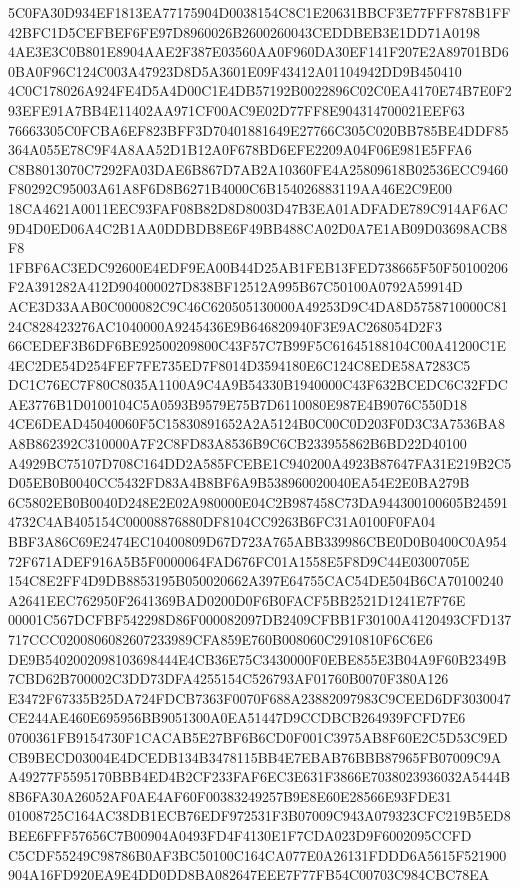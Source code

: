 \documentclass[UTF8,fontset=fandol,zihao=-4,a4paper]{ctexart}
\begin{document}
{{5C0FA30D934EF1813EA77175904D0038154C8C1E20631BBCF3E77FFF878B1FF42BFC1D5CEFBEF6FE97D8960026B2600260043CEDDBEB3E1DD71A0198
4AE3E3C0B801E8904AAE2F387E03560AA0F960DA30EF141F207E2A89701BD60BA0F96C124C003A47923D8D5A3601E09F43412A01104942DD9B450410
4C0C178026A924FE4D5A4D00C1E4DB57192B0022896C02C0EA4170E74B7E0F293EFE91A7BB4E11402AA971CF00AC9E02D77FF8E904314700021EEF63
76663305C0FCBA6EF823BFF3D70401881649E27766C305C020BB785BE4DDF85364A055E78C9F4A8AA52D1B12A0F678BD6EFE2209A04F06E981E5FFA6
C8B8013070C7292FA03DAE6B867D7AB2A10360FE4A25809618B02536ECC9460F80292C95003A61A8F6D8B6271B4000C6B154026883119AA46E2C9E00
18CA4621A0011EEC93FAF08B82D8D8003D47B3EA01ADFADE789C914AF6AC9D4D0ED06A4C2B1AA0DDBDB8E6F49BB488CA02D0A7E1AB09D03698ACB8F8
1FBF6AC3EDC92600E4EDF9EA00B44D25AB1FEB13FED738665F50F50100206F2A391282A412D904000027D838BF12512A995B67C50100A0792A59914D
ACE3D33AAB0C000082C9C46C620505130000A49253D9C4DA8D5758710000C8124C828423276AC1040000A9245436E9B646820940F3E9AC268054D2F3
66CEDEF3B6DF6BE92500209800C43F57C7B99F5C61645188104C00A41200C1E4EC2DE54D254FEF7FE735ED7F8014D3594180E6C124C8EDE58A7283C5
DC1C76EC7F80C8035A1100A9C4A9B54330B1940000C43F632BCEDC6C32FDCAE3776B1D0100104C5A0593B9579E75B7D6110080E987E4B9076C550D18
4CE6DEAD45040060F5C15830891652A2A5124B0C00C0D203F0D3C3A7536BA8A8B862392C310000A7F2C8FD83A8536B9C6CB233955862B6BD22D40100
A4929BC75107D708C164DD2A585FCEBE1C940200A4923B87647FA31E219B2C5D05EB0B0040CC5432FD83A4B8BF6A9B538960020040EA54E2E0BA279B
6C5802EB0B0040D248E2E02A980000E04C2B987458C73DA944300100605B245914732C4AB405154C00008876880DF8104CC9263B6FC31A0100F0FA04
BBF3A86C69E2474EC10400809D67D723A765ABB339986CBE0D0B0400C0A95472F671ADEF916A5B5F0000064FAD676FC01A1558E5F8D9C44E0300705E
154C8E2FF4D9DB8853195B050020662A397E64755CAC54DE504B6CA70100240A2641EEC762950F2641369BAD0200D0F6B0FACF5BB2521D1241E7F76E
00001C567DCFBF542298D86F000082097DB2409CFBB1F30100A4120493CFD137717CCC0200806082607233989CFA859E760B008060C2910810F6C6E6
DE9B5402002098103698444E4CB36E75C3430000F0EBE855E3B04A9F60B2349B7CBD62B700002C3DD73DFA4255154C526793AF01760B0070F380A126
E3472F67335B25DA724FDCB7363F0070F688A23882097983C9CEED6DF3030047CE244AE460E695956BB9051300A0EA51447D9CCDBCB264939FCFD7E6
0700361FB9154730F1CACAB5E27BF6B6CD0F001C3975AB8F60E2C5D53C9EDCB9BECD03004E4DCEDB134B3478115BB4E7EBAB76BBB87965FB07009C9A
A49277F5595170BBB4ED4B2CF233FAF6EC3E631F3866E7038023936032A5444B8B6FA30A26052AF0AE4AF60F00383249257B9E8E60E28566E93FDE31
01008725C164AC38DB1ECB76EDF972531F3B07009C943A079323CFC219B5ED8BEE6FFF57656C7B00904A0493FD4F4130E1F7CDA023D9F6002095CCFD
C5CDF55249C98786B0AF3BC50100C164CA077E0A26131FDDD6A5615F521900904A16FD920EA9E4DD0DD8BA082647EEE7F77FB54C00703C984CBC78EA
}}
\end{document}
